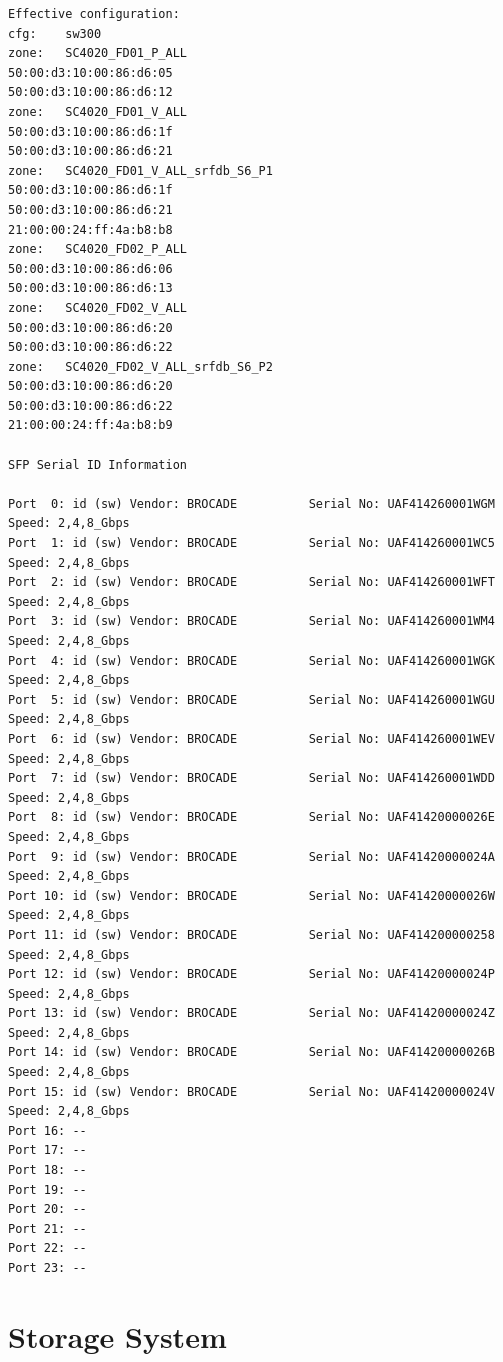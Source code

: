 \documentclass[11pt
  , a4paper
  , article
  , oneside
]{memoir}
\begin{document}
\begin{lstlisting}[style=termstyle]
Effective configuration:
cfg:	sw300	
zone:	SC4020_FD01_P_ALL	
50:00:d3:10:00:86:d6:05
50:00:d3:10:00:86:d6:12
zone:	SC4020_FD01_V_ALL	
50:00:d3:10:00:86:d6:1f
50:00:d3:10:00:86:d6:21
zone:	SC4020_FD01_V_ALL_srfdb_S6_P1	
50:00:d3:10:00:86:d6:1f
50:00:d3:10:00:86:d6:21
21:00:00:24:ff:4a:b8:b8
zone:	SC4020_FD02_P_ALL	
50:00:d3:10:00:86:d6:06
50:00:d3:10:00:86:d6:13
zone:	SC4020_FD02_V_ALL	
50:00:d3:10:00:86:d6:20
50:00:d3:10:00:86:d6:22
zone:	SC4020_FD02_V_ALL_srfdb_S6_P2	
50:00:d3:10:00:86:d6:20
50:00:d3:10:00:86:d6:22
21:00:00:24:ff:4a:b8:b9

SFP Serial ID Information

Port  0: id (sw) Vendor: BROCADE          Serial No: UAF414260001WGM  Speed: 2,4,8_Gbps 
Port  1: id (sw) Vendor: BROCADE          Serial No: UAF414260001WC5  Speed: 2,4,8_Gbps 
Port  2: id (sw) Vendor: BROCADE          Serial No: UAF414260001WFT  Speed: 2,4,8_Gbps 
Port  3: id (sw) Vendor: BROCADE          Serial No: UAF414260001WM4  Speed: 2,4,8_Gbps 
Port  4: id (sw) Vendor: BROCADE          Serial No: UAF414260001WGK  Speed: 2,4,8_Gbps 
Port  5: id (sw) Vendor: BROCADE          Serial No: UAF414260001WGU  Speed: 2,4,8_Gbps 
Port  6: id (sw) Vendor: BROCADE          Serial No: UAF414260001WEV  Speed: 2,4,8_Gbps 
Port  7: id (sw) Vendor: BROCADE          Serial No: UAF414260001WDD  Speed: 2,4,8_Gbps 
Port  8: id (sw) Vendor: BROCADE          Serial No: UAF41420000026E  Speed: 2,4,8_Gbps 
Port  9: id (sw) Vendor: BROCADE          Serial No: UAF41420000024A  Speed: 2,4,8_Gbps 
Port 10: id (sw) Vendor: BROCADE          Serial No: UAF41420000026W  Speed: 2,4,8_Gbps 
Port 11: id (sw) Vendor: BROCADE          Serial No: UAF414200000258  Speed: 2,4,8_Gbps 
Port 12: id (sw) Vendor: BROCADE          Serial No: UAF41420000024P  Speed: 2,4,8_Gbps 
Port 13: id (sw) Vendor: BROCADE          Serial No: UAF41420000024Z  Speed: 2,4,8_Gbps 
Port 14: id (sw) Vendor: BROCADE          Serial No: UAF41420000026B  Speed: 2,4,8_Gbps 
Port 15: id (sw) Vendor: BROCADE          Serial No: UAF41420000024V  Speed: 2,4,8_Gbps 
Port 16: -- 
Port 17: -- 
Port 18: -- 
Port 19: -- 
Port 20: -- 
Port 21: -- 
Port 22: -- 
Port 23: -- 
\end{lstlisting}

\clearpage

\chapter{Storage System}
\end{document}
